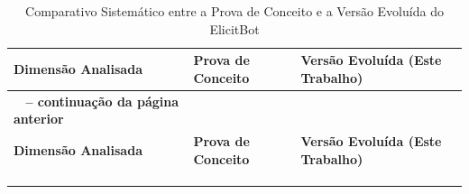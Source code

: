 \noindent
{
\footnotesize 
\renewcommand{\arraystretch}{1.15}
\setlength{\LTleft}{0pt}
\setlength{\LTright}{0pt}

\begin{xltabular}{\textwidth}{|>{\raggedright\arraybackslash}p{2.8cm}|>{\raggedright\arraybackslash}X|>{\raggedright\arraybackslash}X|}
    \caption{Comparativo Sistemático entre a Prova de Conceito e a Versão Evoluída do ElicitBot}
    \label{tab:comparativo_versoes} \\
    \toprule
    \textbf{Dimensão Analisada} & \textbf{Prova de Conceito \cite{junior2025}} & \textbf{Versão Evoluída (Este Trabalho)} \\
    \midrule
    \endfirsthead

    {{\bfseries \tablename\ \thetable{} -- continuação da página anterior}} \\
    \toprule
    \textbf{Dimensão Analisada} & \textbf{Prova de Conceito \cite{junior2025}} & \textbf{Versão Evoluída (Este Trabalho)} \\
    \midrule
    \endhead

    \midrule {} \\
    \endfoot

    \bottomrule
     \\
    \endlastfoot
    

\end{xltabular}}

